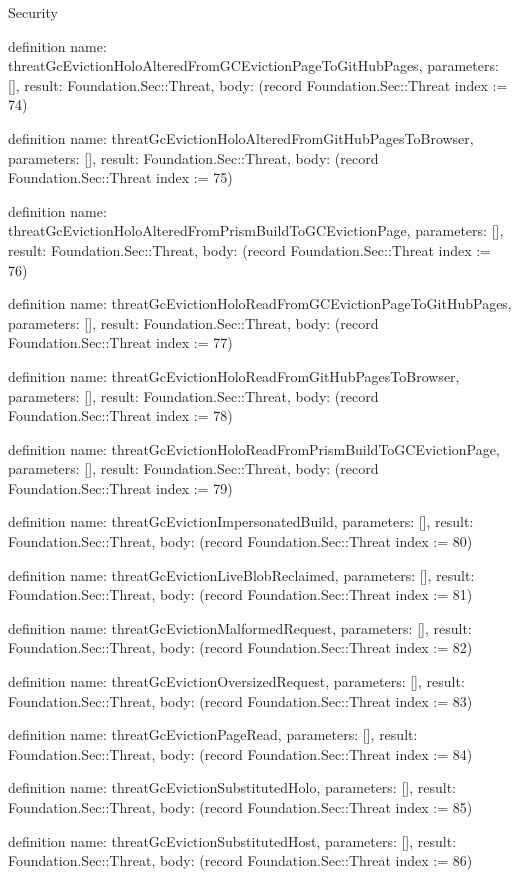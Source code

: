 \begin{lexlean}{Security}
\begin{semanticmodule}
definition{
  name: threatGcEvictionHoloAlteredFromGCEvictionPageToGitHubPages,
  parameters: [],
  result: Foundation.Sec::Threat,
  body: (record Foundation.Sec::Threat {index := 74})
}

definition{
  name: threatGcEvictionHoloAlteredFromGitHubPagesToBrowser,
  parameters: [],
  result: Foundation.Sec::Threat,
  body: (record Foundation.Sec::Threat {index := 75})
}

definition{
  name: threatGcEvictionHoloAlteredFromPrismBuildToGCEvictionPage,
  parameters: [],
  result: Foundation.Sec::Threat,
  body: (record Foundation.Sec::Threat {index := 76})
}

definition{
  name: threatGcEvictionHoloReadFromGCEvictionPageToGitHubPages,
  parameters: [],
  result: Foundation.Sec::Threat,
  body: (record Foundation.Sec::Threat {index := 77})
}

definition{
  name: threatGcEvictionHoloReadFromGitHubPagesToBrowser,
  parameters: [],
  result: Foundation.Sec::Threat,
  body: (record Foundation.Sec::Threat {index := 78})
}

definition{
  name: threatGcEvictionHoloReadFromPrismBuildToGCEvictionPage,
  parameters: [],
  result: Foundation.Sec::Threat,
  body: (record Foundation.Sec::Threat {index := 79})
}

definition{
  name: threatGcEvictionImpersonatedBuild,
  parameters: [],
  result: Foundation.Sec::Threat,
  body: (record Foundation.Sec::Threat {index := 80})
}

definition{
  name: threatGcEvictionLiveBlobReclaimed,
  parameters: [],
  result: Foundation.Sec::Threat,
  body: (record Foundation.Sec::Threat {index := 81})
}

definition{
  name: threatGcEvictionMalformedRequest,
  parameters: [],
  result: Foundation.Sec::Threat,
  body: (record Foundation.Sec::Threat {index := 82})
}

definition{
  name: threatGcEvictionOversizedRequest,
  parameters: [],
  result: Foundation.Sec::Threat,
  body: (record Foundation.Sec::Threat {index := 83})
}

definition{
  name: threatGcEvictionPageRead,
  parameters: [],
  result: Foundation.Sec::Threat,
  body: (record Foundation.Sec::Threat {index := 84})
}

definition{
  name: threatGcEvictionSubstitutedHolo,
  parameters: [],
  result: Foundation.Sec::Threat,
  body: (record Foundation.Sec::Threat {index := 85})
}

definition{
  name: threatGcEvictionSubstitutedHost,
  parameters: [],
  result: Foundation.Sec::Threat,
  body: (record Foundation.Sec::Threat {index := 86})
}


\end{semanticmodule}
\end{lexlean}
